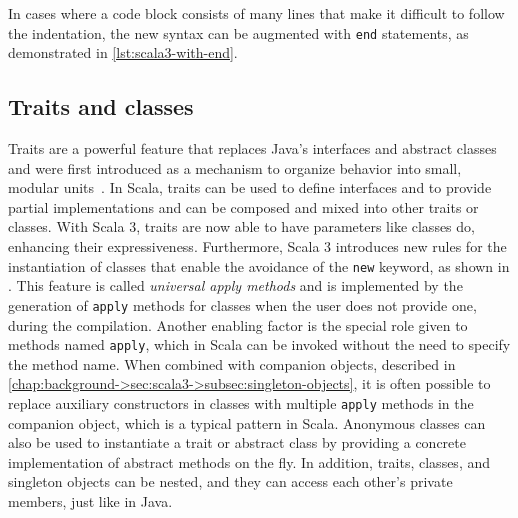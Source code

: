 


In cases where a code block consists of many lines that make it difficult to follow the indentation, the new syntax can be augmented with \texttt{end} statements, as demonstrated in \cref{lst:scala3-with-end}.




\subsection{Traits and classes}

Traits are a powerful feature that replaces Java's interfaces and abstract classes and were first introduced as a mechanism to organize behavior into small, modular units~\cite{traits}.
%
In Scala, traits can be used to define interfaces and to provide partial implementations and can be composed and mixed into other traits or classes.
%
With Scala 3, traits are now able to have parameters like classes do, enhancing their expressiveness.
%
Furthermore, Scala 3 introduces new rules for the instantiation of classes that enable the avoidance of the \texttt{new} keyword, as shown in .
%
This feature is called \textit{universal apply methods} and is implemented by the generation of \texttt{apply} methods for classes when the user does not provide one, during the compilation.
%
Another enabling factor is the special role given to methods named \texttt{apply}, which in Scala can be invoked without the need to specify the method name.
%
When combined with companion objects, described in \cref{chap:background->sec:scala3->subsec:singleton-objects}, it is often possible to replace auxiliary constructors in classes with multiple \texttt{apply} methods in the companion object, which is a typical pattern in Scala.
%
Anonymous classes can also be used to instantiate a trait or abstract class by providing a concrete implementation of abstract methods on the fly.
%
In addition, traits, classes, and singleton objects can be nested, and they can access each other's private members, just like in Java.

